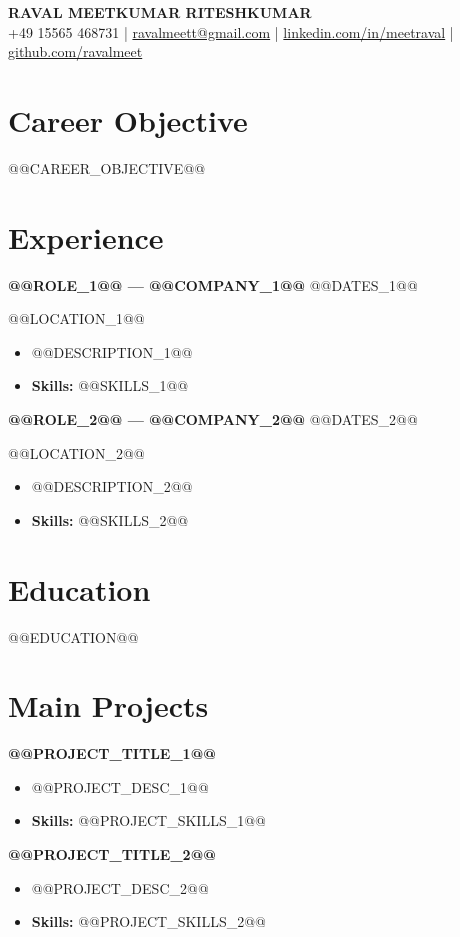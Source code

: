 \documentclass[a4paper,10pt]{article}
\begin{document}
\begin{center}
  {\large\bfseries RAVAL MEETKUMAR RITESHKUMAR}\\[-1pt]
  {\small +49 15565 468731 \;|\; \href{mailto:ravalmeett@gmail.com}{ravalmeett@gmail.com} \;|\; \href{https://www.linkedin.com/in/meetraval/}{linkedin.com/in/meetraval} \;|\; \href{https://github.com/ravalmeet}{github.com/ravalmeet}}
\end{center}
\vspace{-6pt}

\section*{Career Objective}
@@CAREER_OBJECTIVE@@\par

\section*{Experience}
\textbf{@@ROLE_1@@ — @@COMPANY_1@@} \hfill @@DATES_1@@\par
@@LOCATION_1@@\par
\begin{itemize}
  \item @@DESCRIPTION_1@@
  \item \textbf{Skills:} @@SKILLS_1@@
\end{itemize}
\textbf{@@ROLE_2@@ — @@COMPANY_2@@} \hfill @@DATES_2@@\par
@@LOCATION_2@@\par
\begin{itemize}
  \item @@DESCRIPTION_2@@
  \item \textbf{Skills:} @@SKILLS_2@@
\end{itemize}

\section*{Education}
@@EDUCATION@@

\section*{Main Projects}
\textbf{@@PROJECT_TITLE_1@@}
\begin{itemize}
  \item @@PROJECT_DESC_1@@
  \item \textbf{Skills:} @@PROJECT_SKILLS_1@@
\end{itemize}
\textbf{@@PROJECT_TITLE_2@@}
\begin{itemize}
  \item @@PROJECT_DESC_2@@
  \item \textbf{Skills:} @@PROJECT_SKILLS_2@@
\end{itemize}
\end{document}
